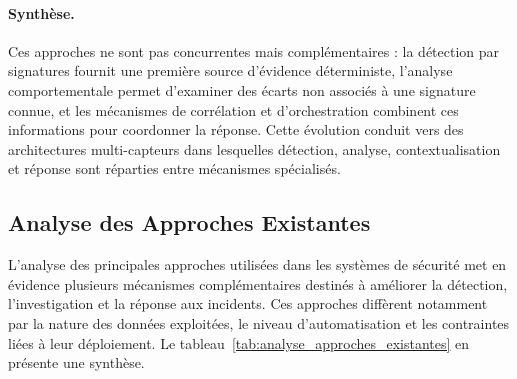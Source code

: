 \paragraph{Synthèse.}
Ces approches ne sont pas concurrentes mais complémentaires : la détection par signatures fournit une première source d'évidence déterministe, l'analyse comportementale permet d'examiner des écarts non associés à une signature connue, et les mécanismes de corrélation et d'orchestration combinent ces informations pour coordonner la réponse. Cette évolution conduit vers des architectures multi-capteurs dans lesquelles détection, analyse, contextualisation et réponse sont réparties entre mécanismes spécialisés.

\subsection{Analyse des Approches Existantes}

L'analyse des principales approches utilisées dans les systèmes de sécurité met en évidence plusieurs mécanismes complémentaires destinés à améliorer la détection, l'investigation et la réponse aux incidents. Ces approches diffèrent notamment par la nature des données exploitées, le niveau d'automatisation et les contraintes liées à leur déploiement. Le tableau~\ref{tab:analyse_approches_existantes} en présente une synthèse.


